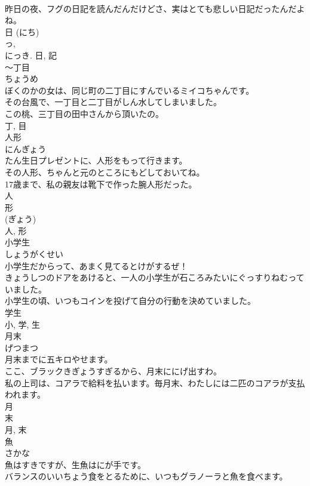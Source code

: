 \documentclass[8pt]{extreport}
\begin{document}
\begin{CJK}{UTF8}{min}
\\	昨日の夜、フグの日記を読んだんだけどさ、実はとても悲しい日記だったんだよね。	
\\	日 (にち) 
\\	っ, 
\\	にっき.	日, 記	
\\	〜丁目	
\\	ちょうめ	
\\	ぼくのかの女は、同じ町の二丁目にすんでいるミイコちゃんです。	
\\	その台風で、一丁目と二丁目がしん水してしまいました。	
\\	この桃、三丁目の田中さんから頂いたの。	
\\	丁, 目	
\\	人形	
\\	にんぎょう	
\\	たん生日プレゼントに、人形をもって行きます。	
\\	その人形、ちゃんと元のところにもどしておいてね。	
\\	17歳まで、私の親友は靴下で作った腕人形だった。	
\\	人 
\\	形 
\\	(ぎょう) 
\\	人, 形	
\\	小学生	
\\	しょうがくせい	
\\	小学生だからって、あまく見てるとけがするぜ！	
\\	きょうしつのドアをあけると、一人の小学生が石ころみたいにぐっすりねむっていました。	
\\	小学生の頃、いつもコインを投げて自分の行動を決めていました。	
\\	学生 
\\	小, 学, 生	
\\	月末	
\\	げつまつ	
\\	月末までに五キロやせます。	
\\	ここ、ブラックきぎょうすぎるから、月末ににげ出すわ。	
\\	私の上司は、コアラで給料を払います。毎月末、わたしには二匹のコアラが支払われます。	
\\	月 
\\	末 
\\	月, 末	
\\	魚	
\\	さかな	
\\	魚はすきですが、生魚はにが手です。	
\\	バランスのいいちょう食をとるために、いつもグラノーラと魚を食べます。	

\end{CJK}
\end{document}
